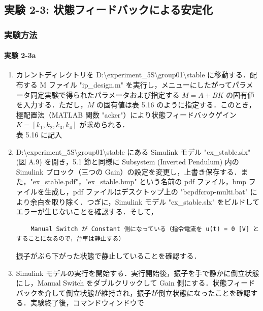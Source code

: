 \newpage

\subsection{実験 2-3: 状態フィードバックによる安定化}
\subsubsection{実験方法}

\paragraph{実験 2-3a}
\begin{enumerate}
  \item カレントディレクトリを D:\textbackslash experiment\_5S\textbackslash group01\textbackslash stable に移動する．配布する M ファイル "ip\_design.m" を実行し，メニューにしたがってパラメータ同定実験で得られたパラメータおよび指定する \( M = A + BK \) の固有値を入力する．ただし，\( M \) の固有値は表 5.16 のように指定する．このとき，極配置法（MATLAB 関数 "acker"）により状態フィードバックゲイン \( K = [k_1, k_2, k_3, k_4] \) が求められる．\\
        表 5.16 に記入
        
  \item D:\textbackslash experiment\_5S\textbackslash group01\textbackslash stable にある Simulink モデル "ex\_stable.slx" (図 A.9) を開き，5.1 節と同様に Subsystem (Inverted Pendulum) 内の Simulink ブロック（三つの Gain）の設定を変更し，上書き保存する．また，"ex\_stable.pdf"，"ex\_stable.bmp" という名前の pdf ファイル，bmp ファイルを生成し，pdf ファイルはデスクトップ上の "bcpdfcrop-multi.bat" により余白を取り除く．つぎに，Simulink モデル "ex\_stable.slx" をビルドしてエラーが生じないことを確認する．そして，
        
        \begin{tcolorbox}[colback=gray!5!white,colframe=gray!75!black]
          \begin{lstlisting}
    Manual Switch が Constant 側になっている（指令電流を u(t) = 0 [V] とすることになるので，台車は静止する）
    \end{lstlisting}
        \end{tcolorbox}
        
        振子がぶら下がった状態で静止していることを確認する．
        
  \item Simulink モデルの実行を開始する．実行開始後，振子を手で静かに倒立状態にし，Manual Switch をダブルクリックして Gain 側にする．状態フィードバックを介して倒立状態が維持され，振子が倒立状態になったことを確認する．実験終了後，コマンドウィンドウで
        

\end{enumerate}
